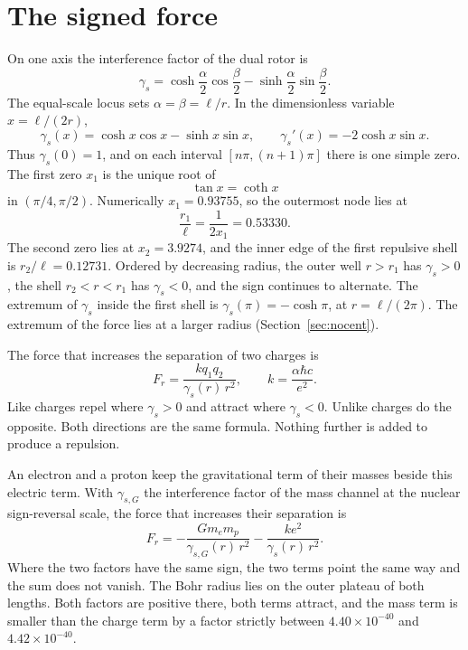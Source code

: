 \documentclass[a4paper]{article}
\begin{document}
\section{The signed force}
\label{sec:force}

On one axis the interference factor of the dual rotor is
\[
\gamma_s
  =\cosh\frac{\alpha}{2}\cos\frac{\beta}{2}
  -\sinh\frac{\alpha}{2}\sin\frac{\beta}{2}.
\]
The equal-scale locus sets \(\alpha=\beta=\ell/r\). In the dimensionless variable \(x=\ell/(2r)\),
\begin{equation}
\label{eq:gamma}
\gamma_s(x)=\cosh x\cos x-\sinh x\sin x,
\qquad
\gamma_s'(x)=-2\cosh x\sin x.
\end{equation}
Thus \(\gamma_s(0)=1\), and on each interval \([n\pi,(n+1)\pi]\) there is one simple zero. The first zero \(x_1\) is the unique root of
\begin{equation}
\label{eq:node}
\tan x=\coth x
\end{equation}
in \((\pi/4,\pi/2)\). Numerically \(x_1=0.93755\), so the outermost node lies at
\[
\frac{r_1}{\ell}=\frac{1}{2x_1}=0.53330.
\]
The second zero lies at \(x_2=3.9274\), and the inner edge of the first repulsive shell is \(r_2/\ell=0.12731\). Ordered by decreasing radius, the outer well \(r>r_1\) has \(\gamma_s>0\), the shell \(r_2<r<r_1\) has \(\gamma_s<0\), and the sign continues to alternate. The extremum of \(\gamma_s\) inside the first shell is \(\gamma_s(\pi)=-\cosh\pi\), at \(r=\ell/(2\pi)\). The extremum of the force lies at a larger radius (Section~\ref{sec:nocent}).

The force that increases the separation of two charges is
\begin{equation}
\label{eq:force}
F_r=\frac{k q_1 q_2}{\gamma_s(r)\,r^{2}},
\qquad
k=\frac{\alpha\hbar c}{e^{2}}.
\end{equation}
Like charges repel where \(\gamma_s>0\) and attract where \(\gamma_s<0\). Unlike charges do the opposite. Both directions are the same formula. Nothing further is added to produce a repulsion.

An electron and a proton keep the gravitational term of their masses beside this electric term. With \(\gamma_{s,G}\) the interference factor of the mass channel at the nuclear sign-reversal scale, the force that increases their separation is
\begin{equation}
\label{eq:both}
F_r
  =-\frac{G m_e m_p}{\gamma_{s,G}(r)\,r^{2}}
  -\frac{k e^{2}}{\gamma_s(r)\,r^{2}}.
\end{equation}
Where the two factors have the same sign, the two terms point the same way and the sum does not vanish. The Bohr radius lies on the outer plateau of both lengths. Both factors are positive there, both terms attract, and the mass term is smaller than the charge term by a factor strictly between \(4.40\times 10^{-40}\) and \(4.42\times 10^{-40}\).
\end{document}
